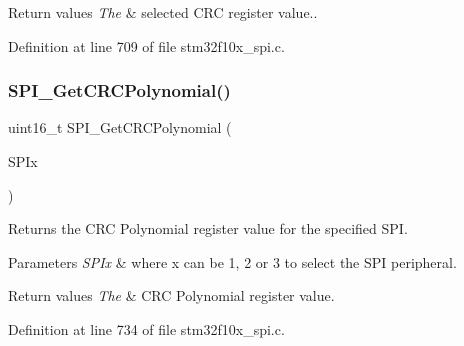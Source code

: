 \begin{DoxyRetVals}{Return values}
{\em The} & selected C\+RC register value.. \\
\hline
\end{DoxyRetVals}


Definition at line 709 of file stm32f10x\+\_\+spi.\+c.

\mbox{\label{group___s_p_i___exported___functions_ga80fb9374cfce670f29128bb78568353f}} 
\subsubsection{\texorpdfstring{S\+P\+I\+\_\+\+Get\+C\+R\+C\+Polynomial()}{SPI\_GetCRCPolynomial()}}
{\footnotesize\ttfamily uint16\+\_\+t S\+P\+I\+\_\+\+Get\+C\+R\+C\+Polynomial (\begin{DoxyParamCaption}\item[{\hyperlink{struct_s_p_i___type_def}{S\+P\+I\+\_\+\+Type\+Def} $\ast$}]{S\+P\+Ix }\end{DoxyParamCaption})}



Returns the C\+RC Polynomial register value for the specified S\+PI. 


\begin{DoxyParams}{Parameters}
{\em S\+P\+Ix} & where x can be 1, 2 or 3 to select the S\+PI peripheral. \\
\hline
\end{DoxyParams}

\begin{DoxyRetVals}{Return values}
{\em The} & C\+RC Polynomial register value. \\
\hline
\end{DoxyRetVals}


Definition at line 734 of file stm32f10x\+\_\+spi.\+c.

\mbox{\label{group___s_p_i___exported___functions_ga3aabd9e2437e213056c0ed9bdfa1a724}} 

